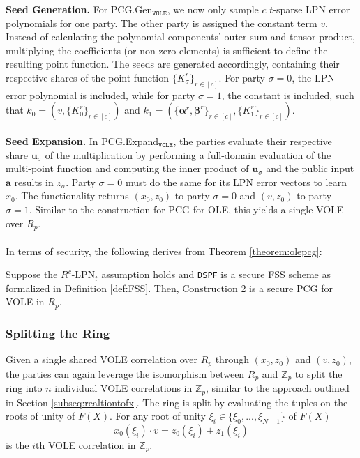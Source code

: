 \textbf{Seed Generation.} For PCG.Gen$_{\texttt{VOLE}}$, we now only sample $c$ $t$-sparse LPN error polynomials for one party. The other party is assigned the constant term $v$. Instead of calculating the polynomial components' outer sum and tensor product, multiplying the coefficients (or non-zero elements) is sufficient to define the resulting point function. The seeds are generated accordingly, containing their respective shares of the point function $\{K_\sigma^{r}\}_{r\in[c]}$. For party $\sigma=0$, the LPN error polynomial is included, while for party $\sigma=1$, the constant is included, such that $k_0 = (v, \{K_0^{r}\}_{r\in[c]})$ and $k_1 = (\{\boldsymbol{\alpha}^r, \boldsymbol{\beta}^r\}_{r\in[c]}, \{K_1^{r}\}_{r\in[c]})$. 
\\\\
\textbf{Seed Expansion.} In PCG.Expand$_{\texttt{VOLE}}$, the parties evaluate their respective share $\boldsymbol{u}_\sigma$ of the multiplication by performing a full-domain evaluation of the multi-point function and computing the inner product of $\boldsymbol{u}_\sigma$ and the public input $\boldsymbol{a}$ results in $z_\sigma$. Party $\sigma=0$ must do the same for its LPN error vectors to learn $x_0$. The functionality returns $(x_0, z_0)$ to party $\sigma=0$ and $(v, z_0)$ to party $\sigma=1$. Similar to the construction for PCG for OLE, this yields a single VOLE over $R_p$. 
\\\\
In terms of security, the following derives from Theorem \ref{theorem:olepcg}: 
\begin{theorem}
Suppose the $R^c$-LPN$_t$ assumption holds and \texttt{DSPF} is a secure FSS scheme as formalized in Definition \ref{def:FSS}. Then, Construction 2 is a secure PCG for VOLE in $R_p$.
\end{theorem}

\subsubsection{Splitting the Ring}
Given a single shared VOLE correlation over $R_p$ through $(x_0, z_0)$ and $(v, z_0)$, the parties can again leverage the isomorphism between $R_p$ and $\mathbb{Z}_{p}$ to split the ring into $n$ individual VOLE correlations in $\mathbb{Z}_{p}$, similar to the approach outlined in Section \ref{subseq:realtiontofx}. The ring is split by evaluating the tuples on the roots of unity of $F(X)$. For any root of unity $\xi_i \in \{\xi_0, ...,\xi_{N-1}\}$ of $F(X)$
\begin{equation}
x_0(\xi_i) \cdot v = z_0(\xi_i)+ z_1(\xi_i)
\end{equation}
is the $i$th VOLE correlation in $\mathbb{Z}_{p}$.

